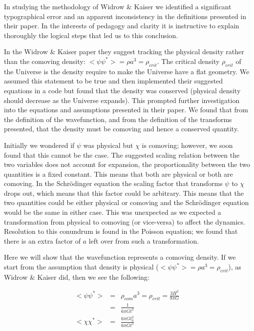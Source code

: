 In studying the methodology of Widrow \& Kaiser we identified a significant typographical error and an apparent inconsistency in the definitions presented in their paper. In the interests of pedagogy and clarity it is instructive to explain thoroughly the logical steps that led us to this conclusion.

In the Widrow \& Kaiser paper they suggest tracking the physical density rather than the comoving density:  $<\psi \psi^*>  = \rho a^3 = \rho_{crit}$. The critical density $\rho_{crit}$ of the Universe is the density require to make the Universe have a flat geometry. We assumed this statement to be true and then implemented their suggested equations in a code but found that the density was conserved (physical density should decrease as the Universe expands). This prompted further investigation into the equations and assumptions presented in their paper. We found that from the definition of the wavefunction, and from the definition of the transforms presented, that the density must be comoving and hence a conserved quantity.

Initially we wondered if $\psi$ was physical but $\chi$ is comoving; however, we soon found that this cannot be the case. The suggested scaling relation between the two variables does not account for expansion, the proportionality between the two quantities is a fixed constant. This means that both are physical or both are comoving. In the Schr\"odinger equation the scaling factor that transforms $\psi$ to $\chi$ drops out, which means that this factor could be arbitrary. This means that the two quantities could be either physical or comoving and the Schr\"odinger equation would be the same in either case. This was unexpected as we expected a transformation from physical to comoving (or vice-versa) to affect the dynamics. Resolution to this conundrum is found in the Poisson equation; we found that there is an extra factor of $a$ left over from such a transformation.

Here we will show that the wavefunction represents a comoving density. If we start from the assumption that density is physical ($<\psi \psi^*>= \rho a^3 = \rho_{crit}$), as Widrow \& Kaiser did, then we see the following:

\begin{eqnarray}
<\psi \psi^*> &=& \rho_{com} a^3 = \rho_{crit} = \frac{3 H^2}{8\pi G} \\
	 &=& \frac{1}{6\pi G t^2} \\
<\chi \chi^*> &=& \frac{6\pi G t_0^2}{6\pi G t^2}
\end{eqnarray}

